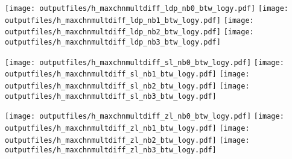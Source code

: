 \documentclass[11pt]{article}
\begin{document}
    \noindent
     \texttt{[image: outputfiles/h\_maxchnmultdiff\_ldp\_nb0\_btw\_logy.pdf]}
     \texttt{[image: outputfiles/h\_maxchnmultdiff\_ldp\_nb1\_btw\_logy.pdf]}
     \texttt{[image: outputfiles/h\_maxchnmultdiff\_ldp\_nb2\_btw\_logy.pdf]}
     \texttt{[image: outputfiles/h\_maxchnmultdiff\_ldp\_nb3\_btw\_logy.pdf]}

    \noindent
     \texttt{[image: outputfiles/h\_maxchnmultdiff\_sl\_nb0\_btw\_logy.pdf]}
     \texttt{[image: outputfiles/h\_maxchnmultdiff\_sl\_nb1\_btw\_logy.pdf]}
     \texttt{[image: outputfiles/h\_maxchnmultdiff\_sl\_nb2\_btw\_logy.pdf]}
     \texttt{[image: outputfiles/h\_maxchnmultdiff\_sl\_nb3\_btw\_logy.pdf]}

    \noindent
     \texttt{[image: outputfiles/h\_maxchnmultdiff\_zl\_nb0\_btw\_logy.pdf]}
     \texttt{[image: outputfiles/h\_maxchnmultdiff\_zl\_nb1\_btw\_logy.pdf]}
     \texttt{[image: outputfiles/h\_maxchnmultdiff\_zl\_nb2\_btw\_logy.pdf]}
     \texttt{[image: outputfiles/h\_maxchnmultdiff\_zl\_nb3\_btw\_logy.pdf]}

    \clearpage



  
\end{document}
